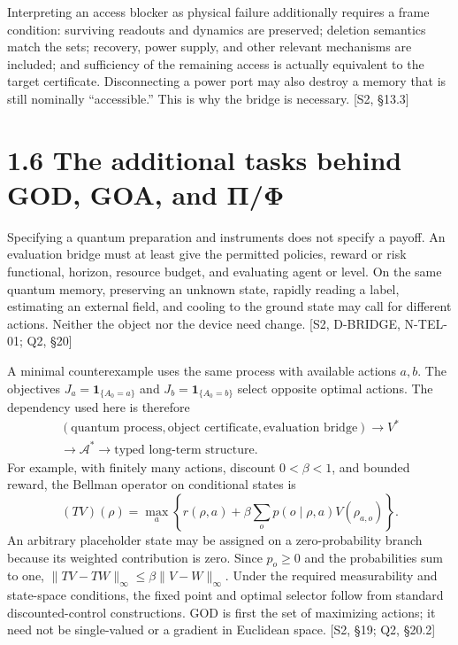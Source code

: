 \documentclass[
  11pt,
  oneside]{book}
\begin{document}
Interpreting an access blocker as physical failure additionally requires
a frame condition: surviving readouts and dynamics are preserved;
deletion semantics match the sets; recovery, power supply, and other
relevant mechanisms are included; and sufficiency of the remaining
access is actually equivalent to the target certificate. Disconnecting a
power port may also destroy a memory that is still nominally
``accessible.'' This is why the bridge is necessary. {[}S2, §13.3{]}

\section{1.6 The additional tasks behind GOD, GOA, and Π/Φ}

Specifying a quantum preparation and instruments does not specify a
payoff. An evaluation bridge must at least give the permitted policies,
reward or risk functional, horizon, resource budget, and evaluating
agent or level. On the same quantum memory, preserving an unknown state,
rapidly reading a label, estimating an external field, and cooling to
the ground state may call for different actions. Neither the object nor
the device need change. {[}S2, D-BRIDGE, N-TEL-01; Q2, §20{]}

A minimal counterexample uses the same process with available actions
\(a,b\). The objectives \(J_a=\mathbf1_{\{A_0=a\}}\) and
\(J_b=\mathbf1_{\{A_0=b\}}\) select opposite optimal actions. The
dependency used here is therefore \[
\begin{gathered}
(\text{quantum process},\text{object certificate},\text{evaluation bridge})\longrightarrow V^*\\
\longrightarrow\mathcal A^*\longrightarrow\text{typed long-term structure}.
\end{gathered}
\] For example, with finitely many actions, discount \(0<\beta<1\), and
bounded reward, the Bellman operator on conditional states is \[
(TV)(\rho)=\max_a\left\{r(\rho,a)+\beta\sum_o p(o\mid\rho,a)
V(\rho_{a,o})\right\}.
\] An arbitrary placeholder state may be assigned on a zero-probability
branch because its weighted contribution is zero. Since \(p_o\ge0\) and
the probabilities sum to one,
\(\|TV-TW\|_\infty\le\beta\|V-W\|_\infty\). Under the required
measurability and state-space conditions, the fixed point and optimal
selector follow from standard discounted-control constructions. GOD is
first the set of maximizing actions; it need not be single-valued or a
gradient in Euclidean space. {[}S2, §19; Q2, §20.2{]}
\end{document}
